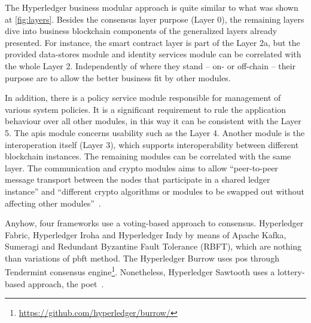 The Hyperledger business modular approach is quite similar to what was shown at \autoref{fig:layers}.
Besides the consensus layer purpose (Layer 0), the remaining layers dive into business blockchain components of the generalized layers already presented.
For instance, the smart contract layer is part of the Layer 2a, but the provided data-stores module and identity services module can be correlated with the whole Layer 2.
Independently of where they stand -- on- or off-chain -- their purpose are to allow the better business fit by other modules.

In addition, there is a policy service module responsible for management of various system policies. It is a significant requirement to rule the application behaviour over all other modules, in this way it can be consistent with the Layer 5.
The \glspl{api} module concerns usability such as the Layer 4.
Another module is the interoperation itself (Layer 3), which supports interoperability between different blockchain instances.
The remaining modules can be correlated with the same layer.
The communication and crypto modules aims to allow ``peer-to-peer message transport between the nodes that participate in a shared ledger instance'' and ``different crypto algorithms or modules to be swapped out without affecting other modules''~\cite{hyper1}.




Anyhow, four frameworks use a voting-based approach to consensus.
Hyperledger Fabric, Hyperledger Iroha and Hyperledger Indy by means of Apache Kafka, Sumeragi and Redundant Byzantine Fault Tolerance (RBFT), which are nothing than variations of \gls{pbft} method.
The Hyperledger Burrow uses \gls{pos} through Tendermint consensus engine\footnote{\href{https://github.com/hyperledger/burrow/}{https://github.com/hyperledger/burrow/}}.
Nonetheless, Hyperledger Sawtooth uses a lottery-based approach, the \gls{poet}~\cite{hyper1}.


